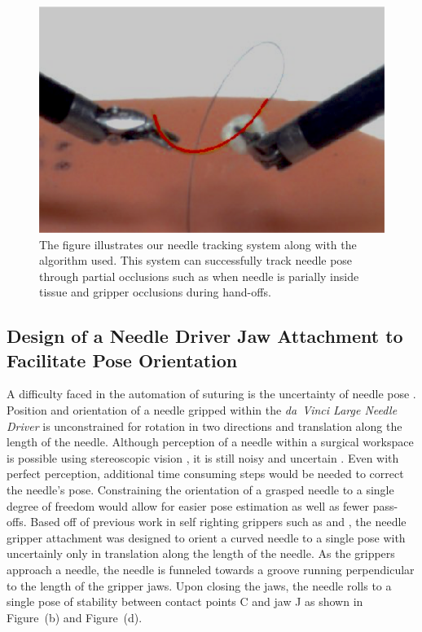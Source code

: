 \documentclass[0-suturing.tex]{subfiles}
\begin{document}
\begin{figure}[!t]
\centering
\includegraphics[width=0.9\linewidth]{figures/needleTrack}
\caption{The figure illustrates our needle tracking system along with the algorithm used. This system can successfully track needle pose through partial occlusions such as when needle is parially inside tissue and gripper occlusions during hand-offs.}
\label{fig:tracking}
\vspace{-10pt}
\end{figure}


\subsection{Design of a Needle Driver Jaw Attachment to Facilitate Pose Orientation}

A difficulty faced in the automation of suturing is the uncertainty of needle pose \tocite. Position and orientation of a needle gripped within the \textit{da~Vinci Large Needle Driver} is unconstrained for rotation in two directions and translation along the length of the needle. Although perception of a needle within a surgical workspace is possible using stereoscopic vision \tocite, it is still noisy and uncertain \tocite. Even with perfect perception, additional time consuming steps would be needed to correct the needle's pose. Constraining the orientation of a grasped needle to a single degree of freedom would allow for easier pose estimation as well as fewer pass-offs. Based off of previous work in self righting grippers such as \cite{Articulating needle driver} and 
\cite{Needle holder with suture filament grasping abilities}, the needle gripper attachment was designed to orient a curved needle to a single pose with uncertainly only in translation along the length of the needle. As the grippers approach a needle, the needle is funneled towards a groove running perpendicular to the length of the gripper jaws. Upon closing the jaws, the needle rolls to a single pose of stability between contact points C  and jaw J as shown in Figure~(b) and Figure~(d).
\end{document}
